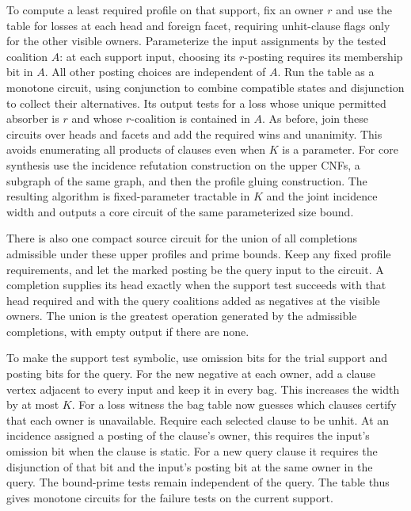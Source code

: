To compute a least required profile on that support,
fix an owner $r$ and use the table for losses at each
head and foreign facet, requiring unhit-clause flags
only for the other visible owners. Parameterize the
input assignments by the tested coalition $A$:
at each support input, choosing its $r$-posting
requires its membership bit in $A$. All other
posting choices are independent of $A$. Run the
table as a monotone circuit, using conjunction
to combine compatible states and disjunction to
collect their alternatives. Its output tests for
a loss whose unique permitted absorber is $r$
and whose $r$-coalition is contained in $A$.
As before, join these circuits over heads and
facets and add the required wins and unanimity.
This avoids enumerating all products of clauses
even when $K$ is a parameter. For core synthesis
use the incidence refutation construction on the
upper CNFs, a subgraph of the same graph, and
then the profile gluing construction. The resulting
algorithm is fixed-parameter tractable in $K$ and
the joint incidence width and outputs a core circuit
of the same parameterized size bound.

There is also one compact source circuit for the union
of all completions admissible under these upper profiles
and prime bounds. Keep any fixed profile requirements,
and let the marked posting be the query input to the
circuit. A completion supplies its head exactly when the
support test succeeds with that head required and with
the query coalitions added as negatives at the visible
owners. The union is the greatest operation generated
by the admissible completions, with empty output if
there are none.

To make the support test symbolic, use omission bits
for the trial support and posting bits for the query.
For the new negative at each owner, add a clause vertex
adjacent to every input and keep it in every bag.
This increases the width by at most $K$. For a loss
witness the bag table now guesses which clauses certify
that each owner is unavailable. Require each selected
clause to be unhit. At an incidence assigned a posting
of the clause's owner, this requires the input's
omission bit when the clause is static. For a new
query clause it requires the disjunction of that bit
and the input's posting bit at the same owner in the
query. The bound-prime tests remain independent of
the query. The table thus gives monotone circuits
for the failure tests on the current support.

